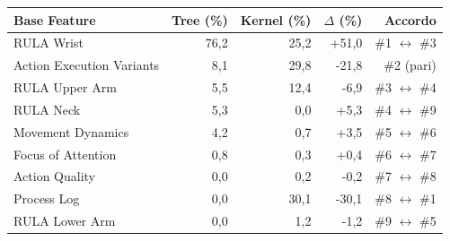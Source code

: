 \begin{tabular*}{\linewidth}{@{}l@{\extracolsep{\fill}}rrrr@{}}
\toprule
\textbf{Base Feature} & \textbf{Tree (\%)} & \textbf{Kernel (\%)} & \textbf{$\Delta$ (\%)} & \textbf{Accordo} \\
\midrule
RULA Wrist & 76{,}2 & 25{,}2 & +51{,}0 & \#1 $\leftrightarrow$ \#3 \\
Action Execution Variants & 8{,}1 & 29{,}8 & -21{,}8 & \#2 (pari) \\
RULA Upper Arm & 5{,}5 & 12{,}4 & -6{,}9 & \#3 $\leftrightarrow$ \#4 \\
RULA Neck & 5{,}3 & 0{,}0 & +5{,}3 & \#4 $\leftrightarrow$ \#9 \\
Movement Dynamics & 4{,}2 & 0{,}7 & +3{,}5 & \#5 $\leftrightarrow$ \#6 \\
Focus of Attention & 0{,}8 & 0{,}3 & +0{,}4 & \#6 $\leftrightarrow$ \#7 \\
Action Quality & 0{,}0 & 0{,}2 & -0{,}2 & \#7 $\leftrightarrow$ \#8 \\
Process Log & 0{,}0 & 30{,}1 & -30{,}1 & \#8 $\leftrightarrow$ \#1 \\
RULA Lower Arm & 0{,}0 & 1{,}2 & -1{,}2 & \#9 $\leftrightarrow$ \#5 \\
\bottomrule
\end{tabular*}
